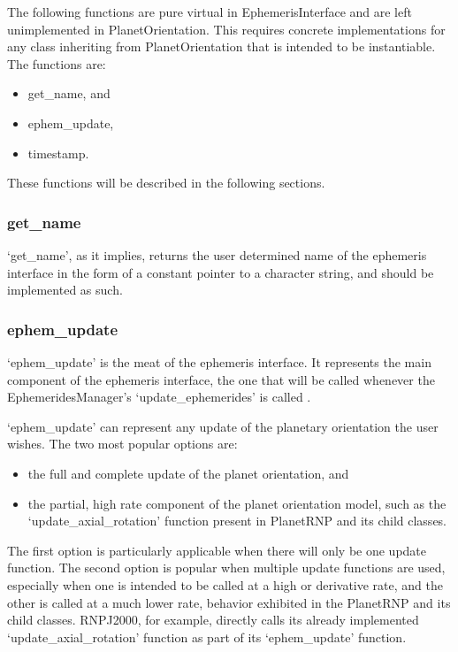 The following functions are pure virtual in EphemerisInterface and are left
unimplemented in PlanetOrientation. This requires
concrete implementations for any class inheriting from PlanetOrientation
that is intended to be instantiable. The functions are:

\begin{itemize}
\item{get\_name, and}
\item{ephem\_update,}
\item{timestamp.}
\end{itemize}

These functions will be described in the following sections.

\subsubsection{get\_name}

`get\_name', as it implies, returns the user determined name of the ephemeris interface in the form of
a constant pointer to a character string, and should be implemented as such.

\subsubsection{ephem\_update}

`ephem\_update' is the meat of the ephemeris interface. It represents the main component of
the ephemeris interface, the one that will be called whenever the EphemeridesManager's
`update\_ephemerides' is called \cite{dynenv:EPHEMERIDES}.

`ephem\_update' can represent any
update of the planetary orientation the user wishes. The two most popular options are:

\begin{itemize}
\item{the full and complete update of the planet orientation, and}
\item{the partial, high rate component of the planet orientation model, such as the
`update\_axial\_rotation' function present in PlanetRNP and its child classes.}
\end{itemize}

The first option is particularly applicable when there will only be one update function.
The second option is popular when multiple update functions are used, especially when
one is intended to be called at a high or derivative rate, and the other is called
at a much lower rate, behavior exhibited in the PlanetRNP and its child classes. RNPJ2000,
for example, directly calls its already implemented `update\_axial\_rotation' function as part of
its `ephem\_update' function.

